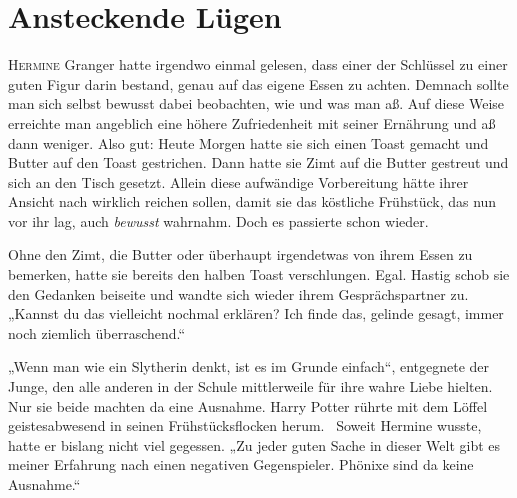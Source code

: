 \chapter{Ansteckende Lügen}

\lettrine{H}{ermine} Granger hatte irgendwo einmal gelesen, dass einer der Schlüssel zu einer guten Figur darin bestand, genau auf das eigene Essen zu achten. Demnach sollte man sich selbst bewusst dabei beobachten, wie und was man aß. Auf diese Weise erreichte man angeblich eine höhere Zufriedenheit mit seiner Ernährung und aß dann weniger.
Also gut: Heute Morgen hatte sie sich einen Toast gemacht und Butter auf den Toast gestrichen. Dann hatte sie Zimt auf die Butter gestreut und sich an den Tisch gesetzt. Allein diese aufwändige Vorbereitung hätte ihrer Ansicht nach wirklich reichen sollen, damit sie das köstliche Frühstück, das nun vor ihr lag, auch \emph{bewusst} wahrnahm. Doch es passierte schon wieder.

Ohne den Zimt, die Butter oder überhaupt irgendetwas von ihrem Essen zu bemerken, hatte sie bereits den halben Toast verschlungen. Egal. Hastig schob sie den Gedanken beiseite und wandte sich wieder ihrem Gesprächspartner zu. „Kannst du das vielleicht nochmal erklären? Ich finde das, gelinde gesagt, immer noch ziemlich überraschend.“

„Wenn man wie ein Slytherin denkt, ist es im Grunde einfach“, entgegnete der Junge, den alle anderen in der Schule mittlerweile für ihre wahre Liebe hielten. Nur sie beide machten da eine Ausnahme. Harry Potter rührte mit dem Löffel geistesabwesend in seinen Frühstücksflocken herum. ~Soweit Hermine wusste, hatte er bislang nicht viel gegessen. „Zu jeder guten Sache in dieser Welt gibt es meiner Erfahrung nach einen negativen Gegenspieler. Phönixe sind da keine Ausnahme.“

